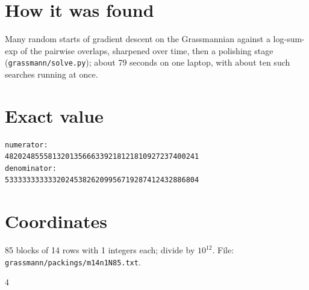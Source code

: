 \documentclass[11pt,a4paper]{article}
\begin{document}
\section{How it was found}
Many random starts of gradient descent on the Grassmannian against a log-sum-exp of the pairwise overlaps, sharpened over time, then a polishing stage (\texttt{grassmann/solve.py}); about 79 seconds on one laptop, with about ten such searches running at once.


\appendix
\section{Exact value}
{\small
\begin{verbatim}
numerator:
482024855581320135666339218121810927237400241
denominator:
533333333333202453826209956719287412432886804
\end{verbatim}}

\section{Coordinates}
85 blocks of 14 rows with 1 integers each; divide by $10^{12}$. File: \texttt{grassmann/packings/m14n1N85.txt}.
{\tiny
\begin{multicols}{4}
\end{multicols}}
\end{document}
